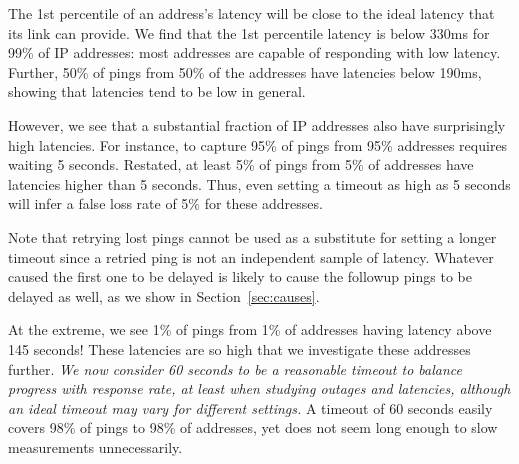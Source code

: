 The 1st percentile of an address's latency will be close to the ideal latency that its link
can provide. We find that the 1st percentile latency is below 330ms for 99\%
of IP addresses: most addresses are capable of
responding with low latency. Further, 50\% of pings from 50\% of the
addresses have latencies below 190ms, showing that latencies tend to
be low in general.

However, we see that a substantial fraction of IP addresses also have
surprisingly high latencies. For instance, to capture 95\% of pings from 95\%
addresses requires waiting 5 seconds.  Restated, at least 5\% of
pings from 5\% of addresses have latencies higher than 5 seconds. Thus, even
setting a timeout as high as 5 seconds will infer a false loss rate of 5\%
for these addresses.

Note that retrying lost pings cannot be used as a substitute for
setting a longer timeout since a retried ping is not an independent
sample of latency. 
Whatever caused the first one to be delayed is likely to cause the
followup pings to be delayed as well, as we show in Section~\ref{sec:causes}.

At the extreme, we see 1\% of pings from 1\% of addresses
having latency above 145 seconds! These latencies are so high that
we investigate these addresses further.  \emph{We now
  consider 60 seconds to be a reasonable timeout to balance
  progress with response rate, at least when studying
  outages and latencies, although an ideal timeout may vary
  for different settings.}  A timeout of 60 seconds easily
covers 98\% of pings to 98\% of addresses, yet does not seem
long enough to slow measurements unnecessarily.

